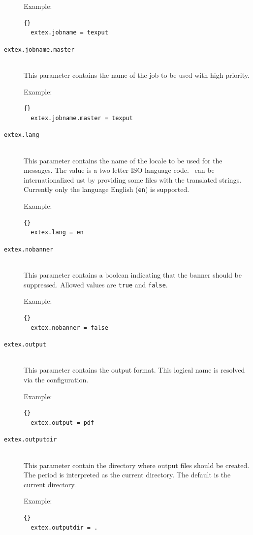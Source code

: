 \documentclass{extex-doc}
\makeatletter
\newcommand\Property[1]{\texttt{#1}\index{#1@\texttt{#1}}}
\makeatother
\begin{document}
\begin{description}
  Example:
\begin{lstlisting}{}
  extex.jobname = texput
\end{lstlisting}

\item[\Property{extex.jobname.master}]\ \\
  This parameter contains the name of the job to be used with high
  priority.

  Example:
\begin{lstlisting}{}
  extex.jobname.master = texput
\end{lstlisting}

\item[\Property{extex.lang}]\ \\
  This parameter contains the name of the locale to be used for the
  messages. The value is a two letter ISO language code.  \ExTeX\ can
  be internationalized ust by providing some files with the translated
  strings. Currently only the language English (\verb|en|) is
  supported.

  Example:
\begin{lstlisting}{}
  extex.lang = en
\end{lstlisting}

\item[\Property{extex.nobanner}]\ \\
  This parameter contains a boolean indicating that the banner should
  be suppressed. Allowed values are \verb|true| and \verb|false|.

  Example:
\begin{lstlisting}{}
  extex.nobanner = false
\end{lstlisting}

\item[\Property{extex.output}]\ \\
  This parameter contains the output format. This logical name is
  resolved via the configuration.

  Example:
\begin{lstlisting}{}
  extex.output = pdf
\end{lstlisting}

\item[\Property{extex.outputdir}]\ \\
  This parameter contain the directory where output files should be
  created. The period is interpreted as the current directory. The
  default is the current directory.

  Example:
\begin{lstlisting}{}
  extex.outputdir = .
\end{lstlisting}


\end{description}
\end{document}
